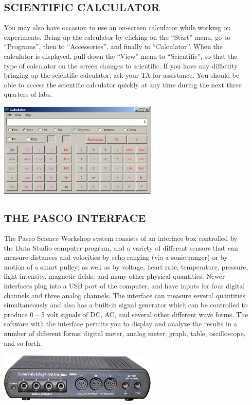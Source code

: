 \subsection*{SCIENTIFIC CALCULATOR}

You may also have occasion to use an on-screen calculator while working on experiments.  Bring up the calculator by clicking on the ``Start'' menu, go to ``Programs'', then to ``Accessories'', and finally to ``Calculator''.  When the calculator is displayed, pull down the ``View'' menu to ``Scientific'', so that the type of calculator on the screen changes to scientific.  If you have any difficulty bringing up the scientific calculator, ask your TA for assistance.  You should be able to access the scientific calculator quickly at any time during the next three quarters of labs.
\begin{center} \includegraphics*[width=0.6\textwidth]{imgs/6labs/6Alab/6Aexp1/6A-Exp1_fig1.jpg} \end{center}

\subsection*{THE PASCO INTERFACE}

The Pasco Science Workshop system consists of an interface box controlled by the Data Studio computer program, and a variety of different sensors that can measure distances and velocities by echo ranging (via a sonic ranger) or by motion of a smart pulley; as well as by voltage, heart rate, temperature, pressure, light intensity, magnetic fields, and many other physical quantities.  Newer interfaces plug into a USB port of the computer, and have inputs for four digital channels and three analog channels.  The interface can measure several quantities simultaneously and also has a built-in signal generator which can be controlled to produce 0 -- 5 volt signals of DC, AC, and several other different wave forms.  The software with the interface permits you to display and analyze the results in a number of different forms: digital meter, analog meter, graph, table, oscilloscope, and so forth.
\begin{center} \includegraphics*[width=0.6\textwidth]{imgs/6labs/6Alab/6Aexp1/6a_exp1_sensorbcak.jpg} \end{center}

